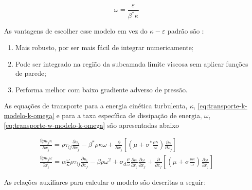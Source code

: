 \begin{equation}
	\label{eq:omega-k-omega}
	\omega = \frac{\varepsilon}{\beta^{*}\kappa}
\end{equation}

As vantagens de escolher esse modelo em vez do \(\kappa-\varepsilon\) padrão são \cite{Moukalled2015}:

\begin{enumerate}

	\item Mais robusto, por ser mais fácil de integrar numericamente;
	
	\item Pode ser integrado na região da subcamada limite viscosa sem aplicar funções de parede;

	\item Performa melhor com baixo gradiente adverso de pressão.
	
\end{enumerate}

As equações de transporte para a energia cinética turbulenta, \(\kappa\), \ref{eq:transporte-k-modelo-k-omega} e para a taxa específica de dissipação de energia, \(\omega\), \ref{eq:transporte-w-modelo-k-omega} são apresentadas abaixo \cite{Wilcox1988ReassessmentOT,Wilcox2006,Wilcox2008}

\begin{gather}
    \frac{\partial \rho u_{j}\kappa}{\partial x_j} = \rho\tau_{ij}\frac{\partial u_i}{\partial x_j} - \beta^{*}\rho\kappa\omega + \frac{\partial}{\partial x_j}\left[\left(\mu + \sigma^{*}\frac{\rho\kappa}{\omega}\right)\frac{\partial\kappa}{\partial x_j}\right]
    \label{eq:transporte-k-modelo-k-omega}
    \\
   	\frac{\partial\rho u_j\omega}{\partial x_j} = \alpha\frac{\omega}{\kappa}\rho\tau_{ij}\frac{\partial u_i}{\partial x_j} - \beta\rho\omega^{2} + \sigma_{d}\frac{\rho}{\omega}\frac{\partial\kappa}{\partial x_j}\frac{\partial\omega}{\partial x_j} + \frac{\partial}{\partial x_j}\left[\left(\mu + \sigma\frac{\rho\kappa}{\omega}\right)\frac{\partial\omega}{\partial x_j}\right]
    \label{eq:transporte-w-modelo-k-omega}
\end{gather}

As relações auxiliares para calcular o modelo são descritas a seguir:

